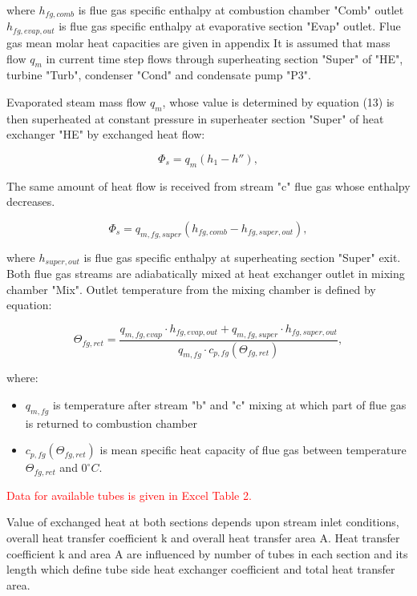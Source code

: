 \documentclass{article}
\begin{document}
	\noindent
	where 
	$h_{fg,comb}$ is flue gas specific enthalpy at combustion chamber "Comb" outlet
	$h_{fg,evap,out}$ is flue gas specific enthalpy at evaporative section "Evap" outlet.
	Flue gas mean molar heat capacities are given in appendix
	It is assumed that mass flow $q_m$ in current time step flows through superheating section "Super" of "HE", turbine "Turb", condenser "Cond" and condensate pump "P3".
	
	Evaporated steam mass flow $q_m$, whose value is determined by equation 
	(13) is then superheated at constant pressure in superheater section 
	"Super" of heat exchanger "HE" by exchanged heat flow:
	
	\begin{equation}\label{eq:evap_steam_mass3}
		\Phi_s = q_m(h_1 - h''),
	\end{equation}
	
	The same amount of heat flow is received from stream "c" flue gas whose enthalpy decreases.
	
	\begin{equation}\label{eq:evap_steam_mass4}
		\Phi_s = q_{m,fg,super} (h_{fg,comb} - h_{fg,super,out}),
	\end{equation}
	
	\noindent
	where $h_{super,out}$ is flue gas specific enthalpy at superheating section "Super" exit. Both flue gas streams are adiabatically mixed at heat exchanger outlet in mixing chamber "Mix". Outlet temperature from the mixing chamber is defined by equation:
	
	\begin{equation}\label{eq:outlet_temp}
		\Theta_{fg,ret} = \frac{q_{m,fg,evap} \cdot h_{fg,evap,out} + q_{m,fg,super} \cdot h_{fg,super,out}}{q_{m,fg} \cdot c_{p,fg} (\Theta_{fg,ret})},
	\end{equation}
	
	\noindent
	where:
	
	\begin{itemize}
		\item $q_{m,fg}$ is temperature after stream "b" and "c" mixing at which part of flue gas is returned to combustion chamber
		\item $c_{p,fg} (\Theta_{fg,ret})$ is mean specific heat capacity of flue gas between temperature $\Theta_{fg,ret}$ and $0^{\circ}C$.
	\end{itemize}
	
	\noindent
	\textcolor{red}{Data for available tubes is given in Excel Table 2.}
	
	\noindent
	Value of exchanged heat at both sections depends upon stream inlet conditions, overall heat transfer coefficient k and overall heat transfer area A. Heat transfer coefficient k and area A are influenced by number of tubes in each section and its length which define tube side heat exchanger coefficient and total heat transfer area.
	
\end{document}
